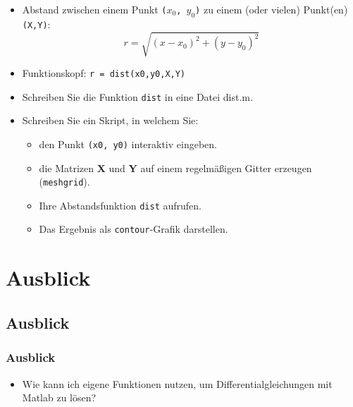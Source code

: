   \secMexercise
  \begin{frame}
      \frameMexercise
      \begin{exercise}
          \sloppy
          \begin{itemize}
            \item Abstand zwischen einem Punkt \texttt{($x_{0}$, $y_{0}$)} zu einem (oder vielen) Punkt(en) \texttt{(X,Y)}:
            \begin{displaymath}
              r = \sqrt{(x - x_{0})^{2} + (y - y_{0})^{2}}
            \end{displaymath}
            \item Funktionskopf: \texttt{r = dist(x0,y0,X,Y)}
            \item Schreiben Sie die Funktion \texttt{dist} in eine Datei dist.m.
            \item Schreiben Sie ein Skript, in welchem Sie:
            \begin{itemize}
              \item den Punkt \texttt{(x0, y0)} interaktiv eingeben.
              \item die Matrizen \textbf{X} und \textbf{Y} auf einem regelmäßigen Gitter erzeugen (\texttt{meshgrid}).
              \item Ihre Abstandsfunktion \texttt{dist} aufrufen.
              \item Das Ergebnis als \texttt{contour}-Grafik darstellen.
            \end{itemize}
          \end{itemize}
      \end{exercise}
  \end{frame}

  \section{Ausblick}

  \subsection{Ausblick}
  \begin{frame}
      \frametitle{Ausblick}
      \begin{itemize}
        \item Wie kann ich eigene Funktionen nutzen, um Differentialgleichungen mit Matlab zu lösen?
      \end{itemize}
  \end{frame}




